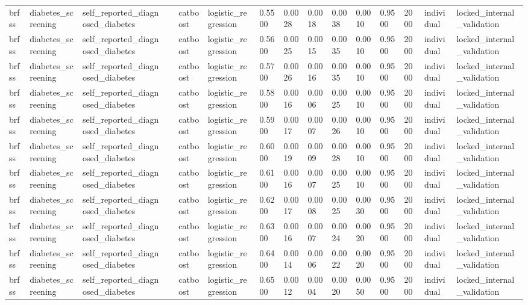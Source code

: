 \begin{tabular}{lllllllllllllll}
brfss & diabetes\_screening & self\_reported\_diagnosed\_diabetes &  & catboost & logistic\_regression & 0.5500 & 0.0028 & 0.0018 & 0.0038 & 0.0010 & 0.9500 & 2000 & individual & locked\_internal\_validation \\
brfss & diabetes\_screening & self\_reported\_diagnosed\_diabetes &  & catboost & logistic\_regression & 0.5600 & 0.0025 & 0.0015 & 0.0035 & 0.0010 & 0.9500 & 2000 & individual & locked\_internal\_validation \\
brfss & diabetes\_screening & self\_reported\_diagnosed\_diabetes &  & catboost & logistic\_regression & 0.5700 & 0.0026 & 0.0016 & 0.0035 & 0.0010 & 0.9500 & 2000 & individual & locked\_internal\_validation \\
brfss & diabetes\_screening & self\_reported\_diagnosed\_diabetes &  & catboost & logistic\_regression & 0.5800 & 0.0016 & 0.0006 & 0.0025 & 0.0010 & 0.9500 & 2000 & individual & locked\_internal\_validation \\
brfss & diabetes\_screening & self\_reported\_diagnosed\_diabetes &  & catboost & logistic\_regression & 0.5900 & 0.0017 & 0.0007 & 0.0026 & 0.0010 & 0.9500 & 2000 & individual & locked\_internal\_validation \\
brfss & diabetes\_screening & self\_reported\_diagnosed\_diabetes &  & catboost & logistic\_regression & 0.6000 & 0.0019 & 0.0009 & 0.0028 & 0.0010 & 0.9500 & 2000 & individual & locked\_internal\_validation \\
brfss & diabetes\_screening & self\_reported\_diagnosed\_diabetes &  & catboost & logistic\_regression & 0.6100 & 0.0016 & 0.0007 & 0.0025 & 0.0010 & 0.9500 & 2000 & individual & locked\_internal\_validation \\
brfss & diabetes\_screening & self\_reported\_diagnosed\_diabetes &  & catboost & logistic\_regression & 0.6200 & 0.0017 & 0.0008 & 0.0025 & 0.0030 & 0.9500 & 2000 & individual & locked\_internal\_validation \\
brfss & diabetes\_screening & self\_reported\_diagnosed\_diabetes &  & catboost & logistic\_regression & 0.6300 & 0.0016 & 0.0007 & 0.0024 & 0.0020 & 0.9500 & 2000 & individual & locked\_internal\_validation \\
brfss & diabetes\_screening & self\_reported\_diagnosed\_diabetes &  & catboost & logistic\_regression & 0.6400 & 0.0014 & 0.0006 & 0.0022 & 0.0020 & 0.9500 & 2000 & individual & locked\_internal\_validation \\
brfss & diabetes\_screening & self\_reported\_diagnosed\_diabetes &  & catboost & logistic\_regression & 0.6500 & 0.0012 & 0.0004 & 0.0020 & 0.0050 & 0.9500 & 2000 & individual & locked\_internal\_validation \\

\end{tabular}
